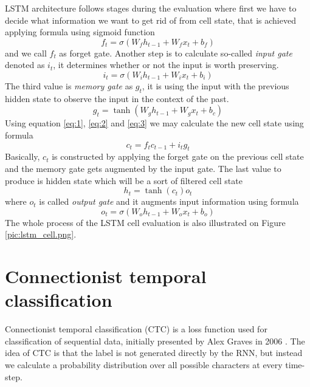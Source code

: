 LSTM architecture follows stages during the evaluation where first we have to decide what information we want to get rid of from cell state, that is achieved applying formula using sigmoid function
\begin{equation} \label{eq:1}
  f_t = {\sigma}({W_f}{h_{t-1}} + {W_f}{x_t} + b_f)
\end{equation}
and we call $f_t$ as forget gate.
Another step is to calculate so-called \textit{input gate} denoted as $i_t$, it determines whether or not the input is worth preserving.
\begin{equation} \label{eq:2}
  i_t = {\sigma}({W_i}{h_{t-1}} + {W_i}{x_t} + b_i)
\end{equation}
The third value is \textit{memory gate} as ${g_t}$, it is using the input with the previous hidden state to observe the input in the context of the past.
\begin{equation} \label{eq:3}
  {g_t} = {\tanh}({W_g}{h_{t-1}} + {W_g}{x_t} + b_c)
\end{equation}
Using equation \ref{eq:1}, \ref{eq:2} and \ref{eq:3} we may calculate the new cell state using formula
\begin{equation} \label{eq:4}
  {c_t} = {f_t}{c_{t-1}} + {i_t}{g_t}
\end{equation}
Basically, $c_t$ is constructed by applying the forget gate on the previous cell state and the memory gate gets augmented by the input gate.
The last value to produce is hidden state which will be a sort of filtered cell state
\begin{equation} \label{eq:5}
  {h_t} = {\tanh}(c_t)o_t
\end{equation}
where $o_t$ is called \textit{output gate} and it augments input information using formula
\begin{equation} \label{eq:6}
  {o_t} = {\sigma}({W_o}{h_{t-1}} + {W_o}{x_t} + b_o)
\end{equation}
The whole process of the LSTM cell evaluation is also illustrated on Figure \ref{pic:lstm_cell.png}.


\section{Connectionist temporal classification}
\label{ctc}

Connectionist temporal classification (CTC) is a loss function used for classification of sequential data, initially presented by Alex Graves in 2006 \cite{ctc}.
The idea of CTC is that the label is not generated directly by the RNN, but instead we calculate a probability distribution over all possible characters at every time-step.

